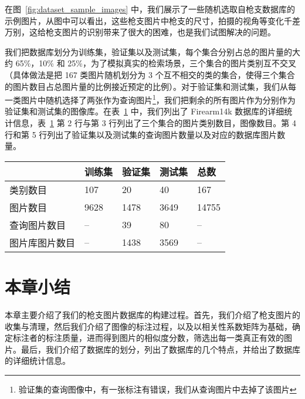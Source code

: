 在图~\ref{fig:dataset_sample_images} 中，我们展示了一些随机选取自枪支数据库的示例图片，从图中可以看出，这些枪支图片中枪支的尺寸，拍摄的视角等变化千差万别，这给枪支图片的识别带来了很大的困难，也是我们试图解决的问题。

我们把数据库划分为训练集，验证集以及测试集，每个集合分别占总的图片量的大约 65\%，10\% 和 25\%，为了模拟真实的检索场景，三个集合的图片类别互不交叉 （具体做法是把 167 类图片随机划分为 3 个互不相交的类的集合，使得三个集合的图片数目占总图片量的比例接近预定的比例）。对于验证集和测试集，我们从每一类图片中随机选择了两张作为查询图片\footnote{验证集的查询图像中，有一张标注有错误，我们从查询图片中去掉了该图片}，我们把剩余的所有图片作为分别作为验证集和测试集的图像库。在表~\ref{table:train_val_test_stat} 中，我们列出了 Firearm14k 数据库的详细统计信息，表~\ref{table:train_val_test_stat} 第 2 行与第 3 行列出了三个集合的图片类别数目，图像数目。第 4 行和第 5 行列出了验证集以及测试集的查询图片数量以及对应的数据库图片数量。

\begin{table}[h]
	\centering
	\label{table:train_val_test_stat}
	\begin{tabular}{@{}lllll@{}}
		\toprule
		          & 训练集 & 验证集 & 测试集 & 总数\\
		\midrule
		类别数目 & 107       & 20             & 40  & 167      \\
		图片数目 & 9628      & 1478           & 3649 & 14755    \\
		查询图片数目 & --        & 39             & 80  & --      \\
		图片库图片数目 & -- & 1438 &  3569  & --\\
		\bottomrule
	\end{tabular}
\end{table}

\section{本章小结}
本章主要介绍了我们的枪支图片数据库的构建过程。首先，我们介绍了枪支图片的收集与清理，然后我们介绍了图像的标注过程，以及以相关性系数矩阵为基础，确定标注者的标注质量，进而得到图片的相似度分数，筛选出每一类真正有效的图片。最后，我们介绍了数据库的划分，列出了数据库的几个特点，并给出了数据库的详细统计信息。



